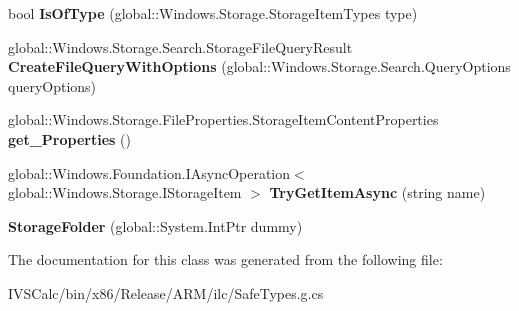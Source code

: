 \begin{DoxyCompactItemize}
bool {\bfseries Is\+Of\+Type} (global\+::\+Windows.\+Storage.\+Storage\+Item\+Types type)
\item 
\mbox{\label{class_windows_1_1_storage_1_1_storage_folder_a61bb687dd56eb8dc8b62c6d031f10c42}} 
global\+::\+Windows.\+Storage.\+Search.\+Storage\+File\+Query\+Result {\bfseries Create\+File\+Query\+With\+Options} (global\+::\+Windows.\+Storage.\+Search.\+Query\+Options query\+Options)
\item 
\mbox{\label{class_windows_1_1_storage_1_1_storage_folder_a00d4c92d7a7b2590b3bee76b0de81d34}} 
global\+::\+Windows.\+Storage.\+File\+Properties.\+Storage\+Item\+Content\+Properties {\bfseries get\+\_\+\+Properties} ()
\item 
\mbox{\label{class_windows_1_1_storage_1_1_storage_folder_a1fb213152c9afc34cd979395c35450f9}} 
global\+::\+Windows.\+Foundation.\+I\+Async\+Operation$<$ global\+::\+Windows.\+Storage.\+I\+Storage\+Item $>$ {\bfseries Try\+Get\+Item\+Async} (string name)
\item 
\mbox{\label{class_windows_1_1_storage_1_1_storage_folder_a3088d0d3f00525cc36b786ec7b321398}} 
{\bfseries Storage\+Folder} (global\+::\+System.\+Int\+Ptr dummy)
\end{DoxyCompactItemize}


The documentation for this class was generated from the following file\+:\begin{DoxyCompactItemize}
\item 
I\+V\+S\+Calc/bin/x86/\+Release/\+A\+R\+M/ilc/Safe\+Types.\+g.\+cs\end{DoxyCompactItemize}
